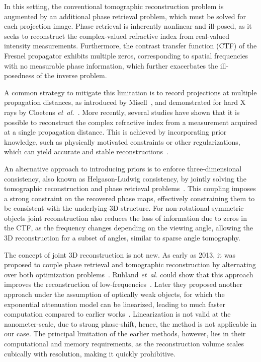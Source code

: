 \documentclass{article}
\begin{document}
In this setting, the conventional tomographic reconstruction problem is augmented by an additional phase retrieval problem, which must be solved for each projection image.
Phase retrieval is inherently nonlinear and ill-posed, as it seeks to reconstruct the complex-valued refractive index from real-valued intensity measurements.
Furthermore, the contrast transfer function (CTF) of the Fresnel propagator exhibits multiple zeros, corresponding to spatial frequencies with no measurable phase information, which further exacerbates the ill-posedness of the inverse problem.

A common strategy to mitigate this limitation is to record projections at multiple propagation distances, as introduced by Misell~\cite{Misell_1973},
and demonstrated for hard X rays by Cloetens \textit{et~al.}~\cite{cloetensHolotomographyQuantitativePhase1999a}.
More recently, several studies have shown that it is possible to reconstruct the complex refractive index from a measurement acquired at a single propagation distance.
This is achieved by incorporating prior knowledge, such as physically motivated constraints or other regularizations, which can yield accurate and stable reconstructions~\cite{doraArtifactsuppressingReconstructionStrongly2024,fienupReconstructionSupportObject1982,wittwerPhaseRetrievalFramework2022}.

An alternative approach to introducing priors is to enforce three-dimensional consistency, also known as Helgason-Ludwig consistency, by jointly solving the tomographic reconstruction and phase retrieval problems~\cite{ludwigRadonTransformEuclidean1966,helgasonRadonTransformEuclidean1965}.
This coupling imposes a strong constraint on the recovered phase maps, effectively constraining them to be consistent with the underlying 3D structure.
For non-rotational symmetric objects joint reconstruction also reduces the loss of information due to zeros in the CTF, as the frequency changes depending on the viewing angle, allowing the 3D reconstruction for a subset of angles, similar to sparse angle tomography.

The concept of joint 3D reconstruction is not new.
As early as 2013,  it was proposed to couple phase retrieval and tomographic reconstruction by alternating over both optimization problems~\cite{kostenkoTotalVariationMinimization2013,ruhlandtThreedimensionalPhaseRetrieval2014}.
Ruhland \textit{et~al.} could show that this approach improves the reconstruction of low-frequencies~\cite{ruhlandtThreedimensionalPhaseRetrieval2014}.
Later they proposed another approach under the assumption of optically weak objects, for which the exponential attenuation model can be linearized, leading to much faster computation compared to earlier works~\cite{ruhlandtThreedimensionalPropagationNearfield2016a}.
Linearization is not valid at the nanometer-scale, due to strong phase-shift, hence, the method is not applicable in our case.
The principal limitation of the earlier methods, however, lies in their computational and memory requirements, as the reconstruction volume scales cubically with resolution, making it quickly prohibitive.
\end{document}
